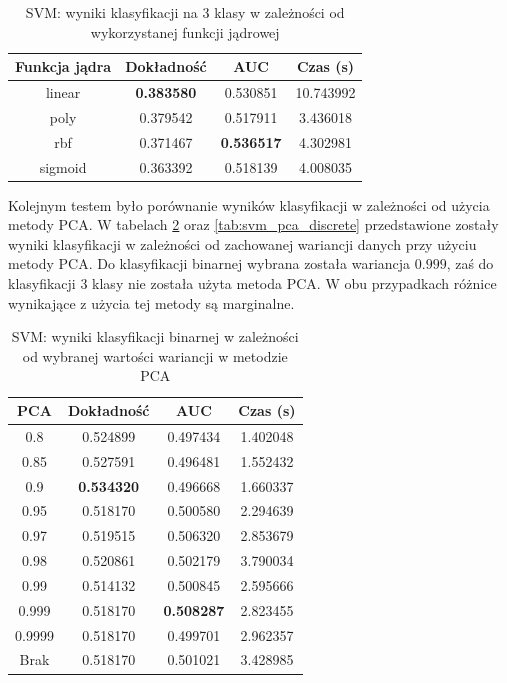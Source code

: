 \documentclass[a4paper, twoside, 11pt, openright]{article}
\begin{document}
\begin{table}[H]
    \centering
    \begin{tabular}{|c|c|c|c|}
    \hline
        \textbf{Funkcja jądra} & \textbf{Dokładność} & \textbf{AUC} & \textbf{Czas (s)} \\ \hline
linear  &  \textbf{0.383580} &  0.530851 &   10.743992 \\ \hline
poly    &  0.379542 &  0.517911 &    3.436018 \\ \hline
rbf     &  0.371467 &  \textbf{0.536517} &    4.302981 \\ \hline
sigmoid &  0.363392 &  0.518139 &    4.008035 \\ \hline
    \end{tabular}
    \caption{SVM: wyniki klasyfikacji na 3 klasy w zależności od wykorzystanej funkcji jądrowej}
    \label{tab:svm_kernel_discrete}
\end{table}


Kolejnym testem było porównanie wyników klasyfikacji w zależności od użycia metody PCA. W tabelach \ref{tab:svm_pca_binary} oraz \ref{tab:svm_pca_discrete} przedstawione zostały wyniki klasyfikacji w zależności od zachowanej wariancji danych przy użyciu metody PCA. Do klasyfikacji binarnej wybrana została wariancja $0.999$, zaś do klasyfikacji 3 klasy nie została użyta metoda PCA. W obu przypadkach różnice wynikające z użycia tej metody są marginalne.

\begin{table}[H]
    \centering
    \begin{tabular}{|c|c|c|c|}
    \hline
        \textbf{PCA} & \textbf{Dokładność} &  \textbf{AUC} &  \textbf{Czas (s)} \\ \hline
0.8                &  0.524899 &  0.497434 &    1.402048 \\ \hline
0.85               &  0.527591 &  0.496481 &    1.552432 \\ \hline
0.9                &  \textbf{0.534320} &  0.496668 &    1.660337 \\ \hline
0.95               &  0.518170 &  0.500580 &    2.294639 \\ \hline
0.97               &  0.519515 &  0.506320 &    2.853679 \\ \hline
0.98               &  0.520861 &  0.502179 &    3.790034 \\ \hline
0.99               &  0.514132 &  0.500845 &    2.595666 \\ \hline
0.999 				&  0.518170 &  \textbf{0.508287} &    2.823455 \\ \hline
0.9999             &  0.518170 &  0.499701 &    2.962357 \\ \hline
Brak                &  0.518170 &  0.501021 &    3.428985 \\ \hline
    \end{tabular}
    \caption{SVM: wyniki klasyfikacji binarnej w zależności od wybranej wartości wariancji w metodzie PCA}
    \label{tab:svm_pca_binary}
\end{table}
\end{document}
